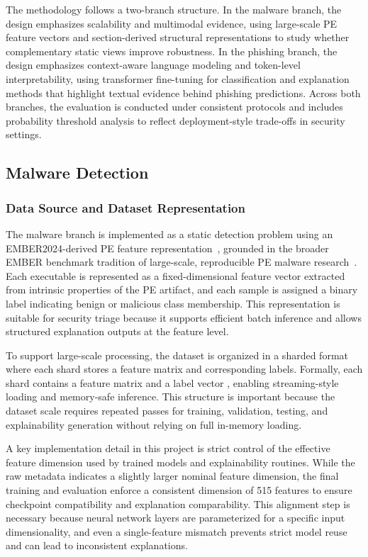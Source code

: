 \documentclass[conference]{IEEEtran}
\begin{document}
The methodology follows a two-branch structure. In the malware branch, the design emphasizes scalability and multimodal evidence, using large-scale PE feature vectors and section-derived structural representations to study whether complementary static views improve robustness. In the phishing branch, the design emphasizes context-aware language modeling and token-level interpretability, using transformer fine-tuning for classification and explanation methods that highlight textual evidence behind phishing predictions. Across both branches, the evaluation is conducted under consistent protocols and includes probability threshold analysis to reflect deployment-style trade-offs in security settings.

\subsection{Malware Detection}

\subsubsection{Data Source and Dataset Representation}

The malware branch is implemented as a static detection problem using an EMBER2024-derived PE feature representation~\cite{JMGPR2024}, grounded in the broader EMBER benchmark tradition of large-scale, reproducible PE malware research~\cite{HP20182018}. Each executable is represented as a fixed-dimensional feature vector extracted from intrinsic properties of the PE artifact, and each sample is assigned a binary label indicating benign or malicious class membership. This representation is suitable for security triage because it supports efficient batch inference and allows structured explanation outputs at the feature level.

To support large-scale processing, the dataset is organized in a sharded format where each shard stores a feature matrix and corresponding labels. Formally, each shard contains a feature matrix and a label vector , enabling streaming-style loading and memory-safe inference. This structure is important because the dataset scale requires repeated passes for training, validation, testing, and explainability generation without relying on full in-memory loading.

A key implementation detail in this project is strict control of the effective feature dimension used by trained models and explainability routines. While the raw metadata indicates a slightly larger nominal feature dimension, the final training and evaluation enforce a consistent dimension of 515 features to ensure checkpoint compatibility and explanation comparability. This alignment step is necessary because neural network layers are parameterized for a specific input dimensionality, and even a single-feature mismatch prevents strict model reuse and can lead to inconsistent explanations.
\end{document}
